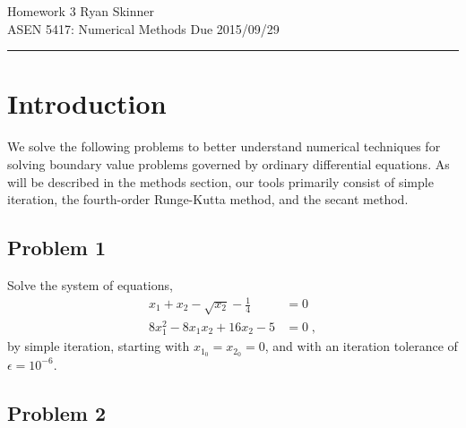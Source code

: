 \documentclass[12pt]{article}
\begin{document}
\pagestyle{fancyplain}
\lhead{}
\chead{}
\rhead{}
\cfoot{\hrule \thepage}

\noindent
{\Large Homework 3}
\hfill
{\large Ryan Skinner}
\\[0.5ex]
{\large ASEN 5417: Numerical Methods}
\hfill
{\large Due 2015/09/29}\\
\hrule
\vspace{6pt}

\section{Introduction} %

We solve the following problems to better understand numerical techniques for solving boundary value problems governed by ordinary differential equations. As will be described in the methods section, our tools primarily consist of simple iteration, the fourth-order Runge-Kutta method, and the secant method.

\subsection{Problem 1}

Solve the system of equations,
\begin{equation}
\begin{alignedat}{2}
x_1 + x_2 - \sqrt{x_2} - \tfrac{1}{4} &= 0 \\
8 x_1^2 - 8 x_1 x_2 + 16 x_2 - 5      &= 0
\;,
\end{alignedat}
\label{eq:prob1}
\end{equation}
by simple iteration, starting with $x_{1_0} = x_{2_0} = 0$, and with an iteration tolerance of $\epsilon = 10^{-6}$.

\subsection{Problem 2}
\end{document}
